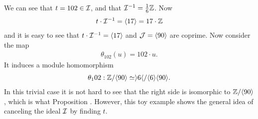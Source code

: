     We can see that \(t = 102\in\mathcal{I}\), and that \(\mathcal{I}^{-1} = \frac{1}{6}\mathbb{Z}\). Now
    \begin{align*}
        t\cdot\mathcal{I}^{-1} = \langle 17 \rangle = 17\cdot\mathbb{Z}
    \end{align*}
    and it is easy to see that \(t\cdot\mathcal{I}^{-1} = \langle 17 \rangle\) and \(\mathcal{J} = \langle 90 \rangle\) are coprime. Now consider the map
    \begin{align*}
        \theta_102(u) = 102\cdot u.
    \end{align*}
    It induces a module homomorphism
    \begin{align*}
        \theta_102:\mathbb{Z}/\langle 90 \rangle \simeq \rangle 6 \langle / \langle 6 \rangle \langle 90 \rangle.
    \end{align*}
    In this trivial case it is not hard to see that the right side is isomorphic to \(\mathbb{Z}/\langle 90 \rangle\), which is what Proposition \cite{Cancel Ideal}. However, this toy example shows the general idea of canceling the ideal \(\mathcal{I}\) by finding \(t\).